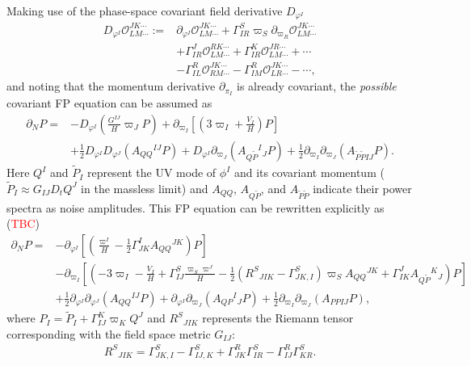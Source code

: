 \documentclass[aps, prd
, preprint
, nofootinbib 
, longbibliography
]{revtex4-1}
\newcommand{\calO}{\mathcal{O}}
\newcommand{\bae}[1]{\begin{align} #1 \end{align}}
\newcommand{\Red}[1]{\textcolor{red}{\sffamily #1}}
\begin{document}
Making use of the phase-space covariant field derivative $D_{\varphi^I}$
\bae{\label{eq: phase-space covariant derivative}
	D_{\varphi^I}\calO^{JK\cdots}_{LM\cdots}:=&\partial_{\varphi^I}\calO^{JK\cdots}_{LM\cdots}
	+\Gamma^S_{IR}\varpi_S\partial_{\varpi_R}\calO^{JK\cdots}_{LM\cdots} \nonumber \\
	&+\Gamma^J_{IR}\calO^{RK\cdots}_{LM\cdots}+\Gamma^K_{IR}\calO^{JR\cdots}_{LM\cdots}+\cdots \nonumber \\
	&-\Gamma^R_{IL}\calO^{JK\cdots}_{RM\cdots}-\Gamma^R_{IM}\calO^{JK\cdots}_{LR\cdots}-\cdots,
}
and noting that the momentum derivative $\partial_{\pi_I}$ is already covariant,
the \emph{possible} covariant FP equation can be assumed as
\bae{
	\partial_NP=&-D_{\varphi^I}\left(\frac{G^{IJ}}{H}\varpi_JP\right)+\partial_{\varpi_I}\left[\left(3\varpi_I+\frac{V_I}{H}\right)P\right] \nonumber \\
	&+\frac{1}{2}D_{\varphi^I}D_{\varphi^J}(A_{QQ}{}^{IJ}P)+D_{\varphi^I}\partial_{\varpi_J}(A_{Q\tilde{P}}{}^I{}_JP)
	+\frac{1}{2}\partial_{\varpi_I}\partial_{\varpi_J}(A_{\tilde{P}\tilde{P}IJ}P).
}
Here $Q^I$ and $\tilde{P}_I$ represent the UV mode of $\phi^I$ and its covariant momentum ($\tilde{P}_I\approx G_{IJ}D_tQ^J$ in the massless limit)
and $A_{QQ}$, $A_{Q\tilde{P}}$, and $A_{\tilde{P}\tilde{P}}$ indicate their power spectra as noise amplitudes.
This FP equation can be rewritten explicitly as (\Red{TBC})
\bae{
	\partial_NP=&-\partial_{\varphi^I}\left[\left(\frac{\varpi^I}{H}-\frac{1}{2}\Gamma^I_{JK}A_{QQ}{}^{JK}\right)P\right] \nonumber \\
	&-\partial_{\varpi_I}\left[\left(-3\varpi_I-\frac{V_I}{H}+\Gamma^S_{IJ}\frac{\varpi_S\varpi^J}{H}
	-\frac{1}{2}\left(R^S{}_{JIK}-\Gamma^S_{JK,I}\right)\varpi_SA_{QQ}{}^{JK}+\Gamma^J_{IK}A_{Q\tilde{P}}{}^K{}_J\right)P\right] \nonumber \\
	&+\frac{1}{2}\partial_{\varphi^I}\partial_{\varphi^J}(A_{QQ}{}^{IJ}P)+\partial_{\varphi^I}\partial_{\varpi_J}(A_{QP}{}^I{}_JP)
	+\frac{1}{2}\partial_{\varpi_I}\partial_{\varpi_J}(A_{PPIJ}P),
}
where $P_I=\tilde{P}_I+\Gamma_{IJ}^K\varpi_KQ^J$ and $R^S{}_{JIK}$ represents the Riemann tensor
corresponding with the field space metric $G_{IJ}$:
\bae{
    R^S{}_{JIK}=\Gamma^S_{JK,I}-\Gamma^S_{IJ,K}
    +\Gamma^R_{JK}\Gamma^S_{IR}-\Gamma^R_{IJ}\Gamma^S_{KR}.
}
\end{document}

